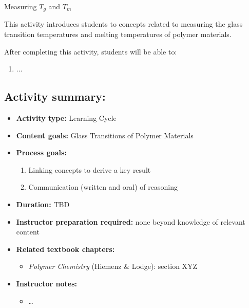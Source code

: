%
%
%
%

\renewcommand{\figpath}{content/polymphys/thermal-transitions/thermal-characterization/figs}
\renewcommand{\labelbase}{thermal-characterization}

\begin{activity}{Measuring $T_g$ and $T_m$}

\begin{instructornotes}
	This activity introduces students to concepts related to measuring the glass transition temperatures and melting temperatures of polymer materials.
	
	After completing this activity, students will be able to:
	\begin{enumerate}
		\item ...
	\end{enumerate}
	
	\subsection*{Activity summary:}
	\begin{itemize}
		\item \textbf{Activity type:} Learning Cycle
		\item \textbf{Content goals:} Glass Transitions of Polymer Materials
		\item \textbf{Process goals:} %
			\begin{enumerate}
				\item Linking concepts to derive a key result
				\item Communication (written and oral) of reasoning
			\end{enumerate}
		\item \textbf{Duration:} TBD
		\item \textbf{Instructor preparation required:} none beyond knowledge of relevant content
		\item \textbf{Related textbook chapters:}
			\begin{itemize}
				\item \emph{Polymer Chemistry} (Hiemenz \& Lodge): section XYZ
			\end{itemize}
		\item \textbf{Instructor notes:}
			\begin{itemize}
				\item \dots
			\end{itemize}
	\end{itemize}
	

\end{instructornotes}
\end{activity}
